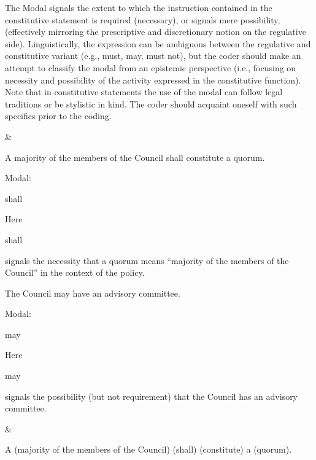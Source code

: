 \begin{landscape}
\begin{longtable}{\tabledims}
The Modal signals the extent to which the instruction contained in the constitutive statement is required (necessary), or signals mere possibility, (effectively mirroring the prescriptive and discretionary notion on the regulative side). Linguistically, the expression can be ambiguous between the regulative and constitutive variant (e.g., must, may, must not), but the coder should make an attempt to classify the modal from an epistemic perspective (i.e., focusing on necessity and possibility of the activity expressed in the constitutive function). Note that in constitutive statements the use of the modal can follow legal traditions or be stylistic in kind. The coder should acquaint oneself with such specifics prior to the coding.

&


\begin{exi}A majority of the members of the Council shall constitute a quorum.\end{exi}

\sp

Modal: \begin{exi}shall\end{exi}

\sp

Here \begin{emp}shall\end{emp} signals the necessity that a quorum means ``majority of the members of the Council'' in the context of the policy. 

\sp


\begin{exi}The Council may have an advisory committee.\end{exi}

\sp

Modal: \begin{exi}may\end{exi}

\sp

Here \begin{emp}may\end{emp} signals the possibility (but not requirement) that the Council has an advisory committee. 

&

\vspace{0.02cm}

\begin{exi}
A \Pp{}(majority of the members of the Council) \M{}(shall) \F{}(constitute) a \E{}(quorum).\end{exi}


\end{longtable}
\end{landscape}
